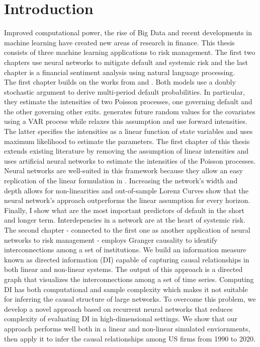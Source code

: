 \cleardoublepage
\chapter*{Introduction}

Improved computational power, the rise of Big Data and recent developments in machine learning have created new areas of research in finance. This thesis consists of three machine learning applications to risk management. The first two chapters use neural networks to mitigate default and systemic risk and the last chapter is a financial sentiment analysis using natural language processing.  \\

The first chapter builds on the works from \citet{DSW} and \citet{Duan2012}. Both models use a doubly stochastic argument to derive multi-period default probabilities. In particular, they estimate the intensities of two Poisson processes, one governing default and the other governing other exits. \citet{DSW} generates future random values for the covariates using a VAR process while \citet{Duan2012} relaxes this assumption and use forward intensities. The latter specifies the intensities as a linear function of state variables and uses maximum likelihood to estimate the parameters. The first chapter of this thesis extends existing literature by removing the assumption of linear intensities and uses artificial neural networks to estimate the intensities of the Poisson processes. Neural networks are well-suited in this framework because they allow an easy replication of the linear formulation in \citet{Duan2012}. Increasing the network's width and depth allows for non-linearities and out-of-sample Lorenz Curves show that the neural network's approach outperforms the linear assumption for every horizon. Finally, I show what are the most important predictors of default in the short and longer term. Interdepencies in a network are at the heart of systemic risk. The second chapter - connected to the first one as another application of neural networks to risk management - employs Granger causality to identify interconnections among a set of institutions. We build an information measure known as directed information (DI) capable of capturing causal relationships in both linear and non-linear systems. The output of this approach is a directed graph that visualizes the interconnections among a set of time series. Computing DI has both computational and sample complexity which makes it not suitable for inferring the causal structure of large networks. To overcome this problem, we develop a novel approach based on recurrent neural networks that reduces complexity of evaluating DI in high-dimensional settings. We show that our approach performs well both in a linear and non-linear simulated enviornments, then apply it to infer the causal relationships among US firms from 1990 to 2020. \\

